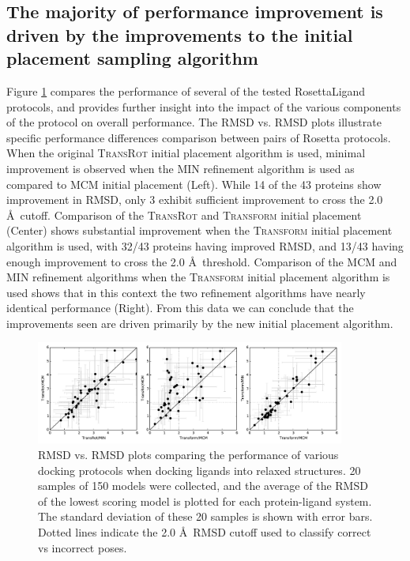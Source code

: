 \subsection{The majority of performance improvement is driven by the improvements to the initial placement sampling algorithm}
Figure \ref{fig:rmsd_vs_rmsd} compares the performance of several of the tested RosettaLigand protocols, and provides further insight into the impact of the various components of the protocol on overall performance.
The \ac{RMSD} vs. \ac{RMSD} plots illustrate specific performance differences comparison between pairs of Rosetta protocols.
When the original \textsc{TransRot} initial placement algorithm is used, minimal improvement is observed when the \ac{MIN} refinement algorithm is used as compared to \ac{MCM} initial placement (Left).
While 14 of the 43 proteins show improvement in \ac{RMSD}, only 3 exhibit sufficient improvement to cross the 2.0 \AA\ cutoff.
Comparison of the \textsc{TransRot} and \textsc{Transform} initial placement (Center) shows substantial improvement when the \textsc{Transform} initial placement algorithm is used, with 32/43 proteins having improved \ac{RMSD}, and 13/43 having enough improvement to cross the 2.0 \AA\ threshold.
Comparison of the \ac{MCM} and \ac{MIN} refinement algorithms when the \textsc{Transform} initial placement algorithm is used shows that in this context the two refinement algorithms have nearly identical performance (Right).
From this data we can conclude that the improvements seen are driven primarily by the new initial placement algorithm. 

\begin{figure}
\centering
\includegraphics[width=4in]{figures/lowres/rmsd_vs_rmsd_relax.pdf}
\caption{
\acs{RMSD} vs. \acs{RMSD} plots comparing the performance of various docking protocols when docking ligands into relaxed structures.
20 samples of 150 models were collected, and the average of the \acs{RMSD} of the lowest scoring model is plotted for each protein-ligand system.
The standard deviation of these 20 samples is shown with error bars. Dotted lines indicate the 2.0 \AA\ \acs{RMSD} cutoff used to classify correct vs incorrect poses. 
}
\label{fig:rmsd_vs_rmsd}
\end{figure}

